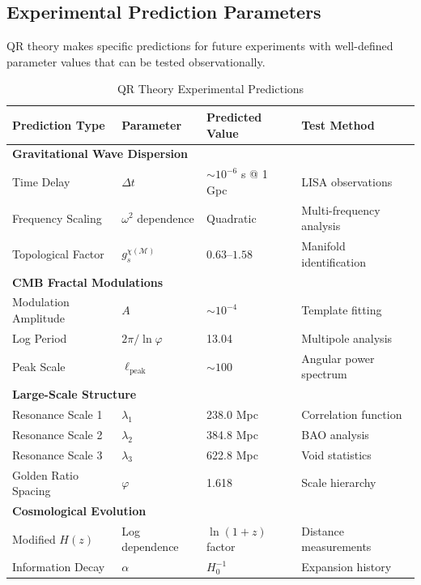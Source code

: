 \subsection{Experimental Prediction Parameters}
\label{subsec:experimental-prediction-parameters}

QR theory makes specific predictions for future experiments with well-defined parameter values that can be tested observationally.

\begin{table}[H]
  \caption{QR Theory Experimental Predictions}
  \label{tab:experimental-predictions-parameters}
  \centering
  \begin{tabular}{@{}llll@{}}
    \toprule
    \textbf{Prediction Type} & \textbf{Parameter} & \textbf{Predicted Value} & \textbf{Test Method} \\
    \midrule
    \multicolumn{4}{l}{\textbf{Gravitational Wave Dispersion}} \\
    Time Delay        & $\Delta t$           & $\sim 10^{-6}$ s @ 1 Gpc & LISA observations \\
    Frequency Scaling & $\omega^2$ dependence & Quadratic                & Multi-frequency analysis \\
    Topological Factor& $g_s^{\chi(\mathcal{M})}$ & $0.63\text{--}1.58$   & Manifold identification \\
    \midrule
    \multicolumn{4}{l}{\textbf{CMB Fractal Modulations}} \\
    Modulation Amplitude & $A$                 & $\sim 10^{-4}$           & Template fitting \\
    Log Period           & $2\pi/\ln\varphi$   & 13.04                    & Multipole analysis \\
    Peak Scale           & $\ell_{\text{peak}}$& $\sim 100$               & Angular power spectrum \\
    \midrule
    \multicolumn{4}{l}{\textbf{Large-Scale Structure}} \\
    Resonance Scale 1 & $\lambda_1$ & 238.0 \si{Mpc} & Correlation function \\
    Resonance Scale 2 & $\lambda_2$ & 384.8 \si{Mpc} & BAO analysis \\
    Resonance Scale 3 & $\lambda_3$ & 622.8 \si{Mpc} & Void statistics \\
    Golden Ratio Spacing & $\varphi$ & 1.618 & Scale hierarchy \\
    \midrule
    \multicolumn{4}{l}{\textbf{Cosmological Evolution}} \\
    Modified $H(z)$ & Log dependence & $\ln(1+z)$ factor & Distance measurements \\
    Information Decay & $\alpha$ & $H_0^{-1}$ & Expansion history \\
    \bottomrule
  \end{tabular}
\end{table}

